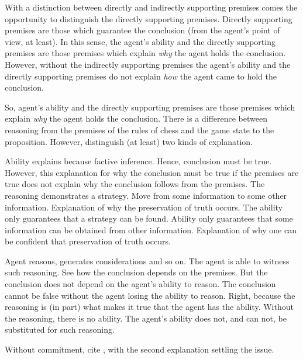 \documentclass[10pt]{article}
\begin{document}
With a distinction between directly and indirectly supporting premises comes the opportunity to distinguish the directly supporting premises.
Directly supporting premises are those which {\color{red} guarantee} the conclusion (from the agent's point of view, at least).
In this sense, the agent's ability and the directly supporting premises are those premises which explain \emph{why} the agent holds the conclusion.
However, without the indirectly supporting premises the agent's ability and the directly supporting premises do not explain \emph{how} the agent came to hold the conclusion.


So, agent's ability and the directly supporting premises are those premises which explain \emph{why} the agent holds the conclusion.
There is a difference between reasoning from the premises of the rules of chess and the game state to the proposition.
However, distinguish (at least) two kinds of explanation.

Ability explains because factive inference.
Hence, conclusion must be true.
However, this explanation for why the conclusion must be true if the premises are true does not explain why the conclusion follows from the premises.
The reasoning demonstrates a strategy.
Move from some information to some other information.
Explanation of why the preservation of truth occurs.
The ability only guarantees that a strategy can be found.
Ability only guarantees that some information can be obtained from other information.
Explanation of why one can be confident that preservation of truth occurs.




\begin{note}
Agent reasons, generates considerations and so on.
The agent is able to witness such reasoning.
See how the conclusion depends on the premises.
But the conclusion does not depend on the agent's ability to reason.
The conclusion cannot be false without the agent losing the ability to reason.
Right, because the reasoning is (in part) what makes it true that the agent has the ability.
Without the reasoning, there is no ability.
The agent's ability does not, and can not, be substituted for such reasoning.
\end{note}

Without commitment, cite \citeauthor{Hieronymi:2011aa}, with the second explanation settling the issue.
\end{document}
